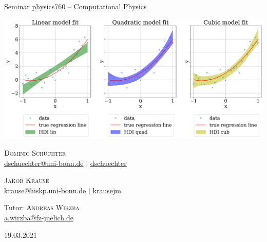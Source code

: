 \documentclass[11pt,aspectratio=1610,dvipsnames]{beamer}
\begin{document}
\begin{frame}[plain]
	\setcounter{page}{0}
	\centering
	{\Large {}}\\
	{Seminar physics760 -- Computational Physics}
	\vfill
	
	\includegraphics[width=0.8\linewidth]{figs/HDI_sigma_07a.pdf}
	\vfill
	\begin{minipage}{\linewidth}
		\centering
		\begin{minipage}{0.45\linewidth}
			\centering
			\textsc{Dominic Schüchter}\\
			\scriptsize \href{mailto:dschuechter@uni-bonn.de}{\faEnvelope  \hspace*{0.1cm}dschuechter@uni-bonn.de} {\color{black}$|$} \href{https://github.com/dschuechter}{\faGithub  \hspace*{0.1cm}dschuechter}\\
		\end{minipage}
		\begin{minipage}{0.45\linewidth}
			\centering
			\textsc{Jakob Krause}\\
			\scriptsize \href{mailto:krause@hiskp.uni-bonn.de}{\faEnvelope  \hspace*{0.1cm}krause@hiskp.uni-bonn.de} {\color{black}$|$} \href{https://github.com/krausejm}{\faGithub  \hspace*{0.1cm}krausejm}\\
		\end{minipage}
	\vspace{.5cm}
	
	Tutor: \textsc{Andreas Wirzba}\\
	\scriptsize \href{mailto:a.wirzba@fz-juelich.de}{\faEnvelope  \hspace*{0.1cm}a.wirzba@fz-juelich.de}
	\end{minipage}
	\vspace{0.2cm}
	
	19.03.2021
	 
	
 		
\end{frame}
\end{document}
